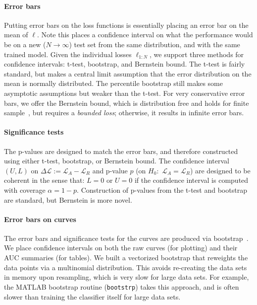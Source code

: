 \documentclass{article}
\newcommand{\Loss}{\mathcal{L}}
\newcommand{\loss}{\ell}
\newcommand{\code}{\texttt}
\newcommand{\sectionx}{\paragraph}
\begin{document}
\sectionx{Error bars}
Putting error bars on the loss functions is essentially placing an error bar on the mean of $\loss$.
Note this places a confidence interval on what the performance would be on a new ($N \rightarrow \infty$) test set from the same distribution, and with the same trained model.
Given the individual losses $\loss_{1:N}$, we support three methods for confidence intervals: t-test, bootstrap, and Bernstein bound.
The t-test is fairly standard, but makes a central limit assumption that the error distribution on the mean is normally distributed.
The percentile bootstrap still makes some asymptotic assumptions but weaker than the t-test.
For very conservative error bars, we offer the Bernstein bound, which is distribution free and holds for finite sample~\citep{Audibert2009}, but requires a \emph{bounded loss}; otherwise, it results in infinite error bars.


\paragraph{Significance tests}
The p-values are designed to match the error bars, and therefore constructed using either t-test, bootstrap, or Bernstein bound.
The confidence interval $(U,L)$ on $\Delta \Loss := \Loss_A - \Loss_R$ and p-value $p$ (on $H_0$:~$\Loss_A = \Loss_R$) are designed to be coherent in the sense that: $L = 0$ or $U = 0$ if the confidence interval is computed with coverage $\alpha=1-p$.
Construction of p-values from the t-test and bootstrap are standard, but Bernstein is more novel.

\paragraph{Error bars on curves}
The error bars and significance tests for the curves are produced via bootstrap~\citep{Efron1994}.
We place confidence intervals on both the raw curves (for plotting) and their AUC summaries (for tables)\@.
We built a vectorized bootstrap that reweights the data points via a multinomial distribution.
This avoids re-creating the data sets in memory upon resampling, which is very slow for large data sets.
For example, the MATLAB bootstrap routine (\code{bootstrp}) takes this approach, and is often slower than training the classifier itself for large data sets.
\end{document}
